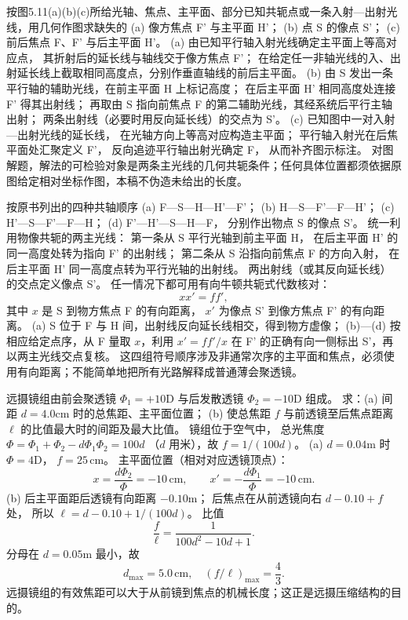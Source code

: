 按图5.11(a)(b)(c)所给光轴、焦点、主平面、部分已知共轭点或一条入射—出射光线，用几何作图求缺失的
(a) 像方焦点 F' 与主平面 H'；
(b) 点 S 的像点 S'；
(c) 前后焦点 F、F' 与后主平面 H'。
\exsolution
(a) 由已知平行轴入射光线确定主平面上等高对应点，
其折射后的延长线与轴线交于像方焦点 F'；
在给定任一非轴光线的入、出射延长线上截取相同高度点，分别作垂直轴线的前后主平面。
(b) 由 S 发出一条平行轴的辅助光线，在前主平面 H 上标记高度；
在后主平面 H' 相同高度处连接 F' 得其出射线；
再取由 S 指向前焦点 F 的第二辅助光线，其经系统后平行主轴出射；
两条出射线（必要时用反向延长线）的交点为 S'。
(c) 已知图中一对入射—出射光线的延长线，
在光轴方向上等高对应构造主平面；
平行轴入射光在后焦平面处汇聚定义 F'，
反向追迹平行轴出射光确定 F，
从而补齐图示标注。
\excheck 对图解题，解法的可检验对象是两条主光线的几何共轭条件；任何具体位置都须依据原图给定相对坐标作图，本稿不伪造未给出的长度。

按原书列出的四种共轴顺序
(a) F—S—H—H'—F'；
(b) H—S—F'—F—H'；
(c) H'—S—F'—F—H；
(d) F'—H'—S—H—F，
分别作出物点 S 的像点 S'。
\exsolution
统一利用物像共轭的两主光线：
第一条从 S 平行光轴到前主平面 H，
在后主平面 H' 的同一高度处转为指向 F' 的出射线；
第二条从 S 沿指向前焦点 F 的方向入射，
在后主平面 H' 同一高度点转为平行光轴的出射线。
两出射线（或其反向延长线）的交点定义像点 S'。
任一情况下都可用有向牛顿共轭式代数核对：
\[
\boxed{xx'=ff'},
\]
其中 $x$ 是 S 到物方焦点 F 的有向距离，
$x'$ 为像点 S' 到像方焦点 F' 的有向距离。
(a) S 位于 F 与 H 间，出射线反向延长线相交，得到物方虚像；
(b)—(d) 按相应给定点序，从 F 量取 $x$，利用 $x'=ff'/x$ 在 F' 的正确有向一侧标出 S'，再以两主光线交点复核。
\excheck 这四组符号顺序涉及非通常次序的主平面和焦点，必须使用有向距离；不能简单地把所有光路解释成普通薄会聚透镜。

远摄镜组由前会聚透镜
$\Phi_1=+10$D 与后发散透镜
$\Phi_2=-10$D 组成。
求：(a) 间距 $d=4.0$cm 时的总焦距、主平面位置；
(b) 使总焦距 $f$ 与前透镜至后焦点距离
$\ell$ 的比值最大时的间距及最大比值。
\exsolution
镜组位于空气中，
总光焦度
$\Phi=\Phi_1+\Phi_2-d\Phi_1\Phi_2=100d$
（$d$ 用米），故
$\boxed{f=1/(100d)}$。
(a) $d=0.04$m 时
$\Phi=4$D，
$\boxed{f=25\,\mathrm{cm}}$。
主平面位置（相对对应透镜顶点）：
\[
\boxed{x=\frac{d\Phi_2}\Phi=-10\,\mathrm{cm}},
\qquad
\boxed{x'=-\frac{d\Phi_1}\Phi=-10\,\mathrm{cm}}.
\]
(b) 后主平面距后透镜有向距离 $-0.10$m；
后焦点在从前透镜向右 $d-0.10+f$ 处，
所以
$\ell=d-0.10+1/(100d)$。
比值
\[
\frac f\ell=\frac1{100d^2-10d+1}.
\]
分母在 $d=0.05$m 最小，故
\[
\boxed{d_{\max}=5.0\,\mathrm{cm}},
\quad
\boxed{(f/\ell)_{\max}=\frac43}.
\]
\excheck 远摄镜组的有效焦距可以大于从前镜到焦点的机械长度；这正是远摄压缩结构的目的。

